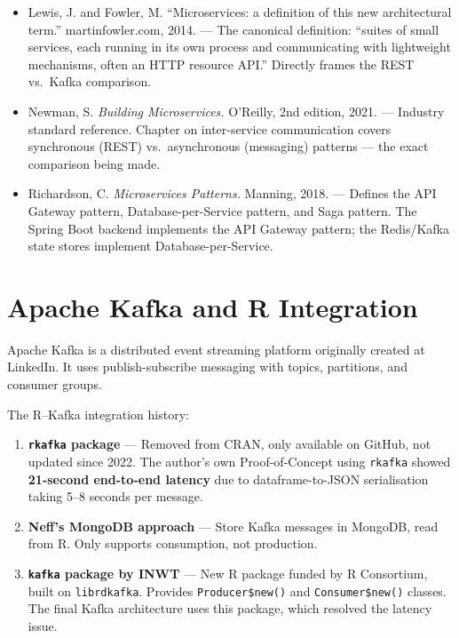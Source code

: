 \documentclass[12pt,a4paper]{article}
\begin{document}
\begin{addedsource}
\begin{itemize}[nosep]
  \item Lewis, J. and Fowler, M. ``Microservices: a definition of this new architectural term.'' martinfowler.com, 2014. --- The canonical definition: ``suites of small services, each running in its own process and communicating with lightweight mechanisms, often an HTTP resource API.'' Directly frames the REST vs.\ Kafka comparison.
  \item Newman, S. \textit{Building Microservices.} O'Reilly, 2nd edition, 2021. --- Industry standard reference. Chapter on inter-service communication covers synchronous (REST) vs.\ asynchronous (messaging) patterns --- the exact comparison being made.
  \item Richardson, C. \textit{Microservices Patterns.} Manning, 2018. --- Defines the API Gateway pattern, Database-per-Service pattern, and Saga pattern. The Spring Boot backend implements the API Gateway pattern; the Redis/Kafka state stores implement Database-per-Service.
\end{itemize}
\end{addedsource}

\section{Apache Kafka and R Integration}

Apache Kafka \cite{kafka_docs} is a distributed event streaming platform originally created at LinkedIn. It uses publish-subscribe messaging with topics, partitions, and consumer groups.

The R--Kafka integration history:

\begin{enumerate}[nosep]
  \item \textbf{\texttt{rkafka} package} \cite{gupta2022} --- Removed from CRAN, only available on GitHub, not updated since 2022. The author's own Proof-of-Concept using \texttt{rkafka} showed \textbf{21-second end-to-end latency} due to dataframe-to-JSON serialisation taking 5--8 seconds per message.
  \item \textbf{Neff's MongoDB approach} \cite{neff2019} --- Store Kafka messages in MongoDB, read from R. Only supports consumption, not production.
  \item \textbf{\texttt{kafka} package by INWT} \cite{neudecker2024} --- New R package funded by R Consortium, built on \texttt{librdkafka}. Provides \texttt{Producer\$new()} and \texttt{Consumer\$new()} classes. The final Kafka architecture uses this package, which resolved the latency issue.
\end{enumerate}
\end{document}
